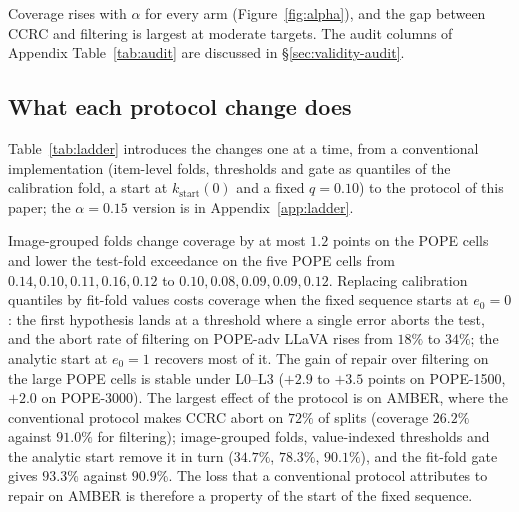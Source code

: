 Coverage rises with $\alpha$ for every arm (Figure~\ref{fig:alpha}), and the gap between CCRC and filtering is
largest at moderate targets. The audit columns of Appendix Table~\ref{tab:audit} are discussed in
\S\ref{sec:validity-audit}.

\subsection{What each protocol change does}
\label{sec:ladder}

Table~\ref{tab:ladder} introduces the changes one at a time, from a conventional implementation (item-level folds,
thresholds and gate as quantiles of the calibration fold, a start at $k_{\mathrm{start}}(0)$ and a fixed $q=0.10$) to the
protocol of this paper; the $\alpha=0.15$ version is in Appendix~\ref{app:ladder}.

\begin{table}[t]
\centering
\caption{Filtering / CCRC certified coverage (\%) at $\alpha=0.10$ as the protocol changes. Rungs L0--L3 use the
fixed gate $q=0.10$, rung L4 chooses the gate on the fit fold, and rung L5 keeps items with no detector
value. L0--L4 use the grounded cohort of each cell; L5 uses all items, so
its absolute level for AMBER is lower: the attribute and relation queries are harder and cannot be repaired.}
\label{tab:ladder}
\small
\resizebox{\textwidth}{!}{}
\end{table}

Image-grouped folds change coverage by at most $1.2$ points on the POPE cells and lower the test-fold exceedance on the five
POPE cells from $0.14, 0.10, 0.11, 0.16, 0.12$ to $0.10, 0.08, 0.09, 0.09, 0.12$. Replacing calibration quantiles by fit-fold
values costs coverage when the fixed sequence starts at $e_0=0$: the first hypothesis lands at a threshold where a single error
aborts the test, and the abort rate of filtering on POPE-adv LLaVA rises from $18\%$ to $34\%$; the analytic start at $e_0=1$
recovers most of it. The gain of repair over filtering on the large POPE cells is stable under L0--L3 ($+2.9$ to $+3.5$ points
on POPE-1500, $+2.0$ on POPE-3000). The largest effect of the protocol is on AMBER, where the conventional protocol makes CCRC
abort on $72\%$ of splits (coverage $26.2\%$ against $91.0\%$ for filtering); image-grouped folds, value-indexed thresholds and
the analytic start remove it in turn ($34.7\%$, $78.3\%$, $90.1\%$), and the fit-fold gate gives $93.3\%$ against $90.9\%$. The loss
that a conventional protocol attributes to repair on AMBER is therefore a property of the start of the fixed sequence.

